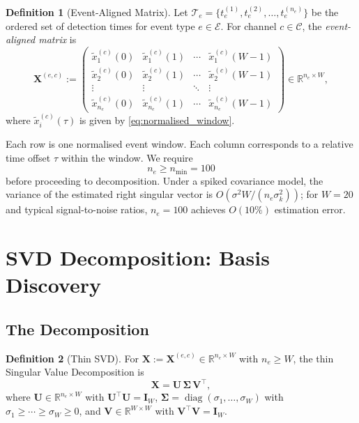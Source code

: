 \documentclass[11pt,a4paper]{article}
\theoremstyle{definition}
\newtheorem{definition}{Definition}[section]
\theoremstyle{plain}
\newcommand{\R}{\mathbb{R}}
\newcommand{\Xmat}{\mathbf{X}}
\newcommand{\Umat}{\mathbf{U}}
\newcommand{\Smat}{\boldsymbol{\Sigma}}
\newcommand{\Vmat}{\mathbf{V}}
\newcommand{\diag}{\operatorname{diag}}
\begin{document}
\begin{definition}[Event-Aligned Matrix]
\label{def:event_matrix}
Let $\mathcal{T}_e = \{t_e^{(1)}, t_e^{(2)}, \ldots, t_e^{(n_e)}\}$ be
the ordered set of detection times for event type $e \in \mathcal{E}$. For
channel $c \in \mathcal{C}$, the \emph{event-aligned matrix} is
\begin{equation}
    \Xmat^{(e,c)} :=
    \begin{pmatrix}
        \tilde{x}^{(c)}_1(0) & \tilde{x}^{(c)}_1(1) & \cdots & \tilde{x}^{(c)}_1(W-1) \\
        \tilde{x}^{(c)}_2(0) & \tilde{x}^{(c)}_2(1) & \cdots & \tilde{x}^{(c)}_2(W-1) \\
        \vdots & \vdots & \ddots & \vdots \\
        \tilde{x}^{(c)}_{n_e}(0) & \tilde{x}^{(c)}_{n_e}(1) & \cdots &
        \tilde{x}^{(c)}_{n_e}(W-1)
    \end{pmatrix}
    \in \R^{n_e \times W},
    \label{eq:event_matrix}
\end{equation}
where $\tilde{x}^{(c)}_i(\tau)$ is given by \eqref{eq:normalised_window}.
\end{definition}

Each row is one normalised event window. Each column corresponds to a
relative time offset $\tau$ within the window. We require
\begin{equation}
    n_e \geq n_{\min} = 100
    \label{eq:min_events}
\end{equation}
before proceeding to decomposition. Under a spiked covariance model, the
variance of the estimated right singular vector is
$O(\sigma^2 W / (n_e \sigma_k^2))$; for $W = 20$ and typical signal-to-noise
ratios, $n_e = 100$ achieves $O(10\%)$ estimation error.

\section{SVD Decomposition: Basis Discovery}
\label{sec:svd}

\subsection{The Decomposition}

\begin{definition}[Thin SVD]
\label{def:svd}
For $\Xmat := \Xmat^{(e,c)} \in \R^{n_e \times W}$ with $n_e \geq W$,
the thin Singular Value Decomposition is
\begin{equation}
    \Xmat = \Umat \, \Smat \, \Vmat^\top,
    \label{eq:svd}
\end{equation}
where
$\Umat \in \R^{n_e \times W}$ with $\Umat^\top \Umat = \mathbf{I}_W$,
$\Smat = \diag(\sigma_1, \ldots, \sigma_W)$ with
$\sigma_1 \geq \cdots \geq \sigma_W \geq 0$, and
$\Vmat \in \R^{W \times W}$ with $\Vmat^\top \Vmat = \mathbf{I}_W$.
\end{definition}
\end{document}
